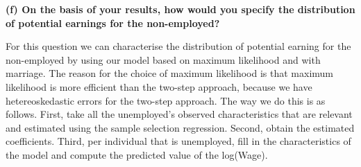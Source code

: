 \documentclass[
]{article}
\newenvironment{Shaded}{\begin{snugshade}}{\end{snugshade}}
\newcommand{\CommentTok}[1]{\textcolor[rgb]{0.56,0.35,0.01}{\textit{#1}}}
\newcommand{\ControlFlowTok}[1]{\textcolor[rgb]{0.13,0.29,0.53}{\textbf{#1}}}
\newcommand{\DataTypeTok}[1]{\textcolor[rgb]{0.13,0.29,0.53}{#1}}
\newcommand{\DecValTok}[1]{\textcolor[rgb]{0.00,0.00,0.81}{#1}}
\newcommand{\KeywordTok}[1]{\textcolor[rgb]{0.13,0.29,0.53}{\textbf{#1}}}
\newcommand{\NormalTok}[1]{#1}
\newcommand{\OperatorTok}[1]{\textcolor[rgb]{0.81,0.36,0.00}{\textbf{#1}}}
\newcommand{\OtherTok}[1]{\textcolor[rgb]{0.56,0.35,0.01}{#1}}
\newcommand{\StringTok}[1]{\textcolor[rgb]{0.31,0.60,0.02}{#1}}
\begin{document}
\textbf{(f) On the basis of your results, how would you specify the
distribution of potential earnings for the non-employed?}

For this question we can characterise the distribution of potential
earning for the non-employed by using our model based on maximum
likelihood and with marriage. The reason for the choice of maximum
likelihood is that maximum likelihood is more efficient than the
two-step approach, because we have hetereoskedastic errors for the
two-step approach. The way we do this is as follows. First, take all the
unemployed's observed characteristics that are relevant and estimated
using the sample selection regression. Second, obtain the estimated
coefficients. Third, per individual that is unemployed, fill in the
characteristics of the model and compute the predicted value of the
log(Wage).

\begin{Shaded}
\end{Shaded}
\end{document}
